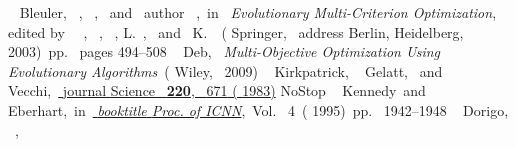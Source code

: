 \documentclass[preprint,linenumbers,amsmath,amssymb,aps,prstab]{revtex4-1}%
\begin{document}
\begin{thebibliography}{37}
\BibitemOpen
{} { {~\bibnamefont
		{Bleuler}},  {~},
	 {~}, \ and\ \bibinfo
	{author} {~},\ }in\ \href@noop {}
{\emph { {{E}volutionary {M}ulti-{C}riterion
			{O}ptimization}}},\  {edited by\ 
	{\ }, 
	{\ }, 
	{~},  {\bibfnamefont
		{L.}~}, \ and\  {\bibfnamefont
		{K.}~}}\ ( {Springer},\ \bibinfo
{address} {Berlin, Heidelberg},\  {2003})\ pp.\ \bibinfo
{pages} {494--508}%
%
\BibitemOpen
{} { {~\bibnamefont
		{Deb}},\ }\href@noop {} {\emph { {{M}ulti-{O}bjective
			{O}ptimization {U}sing {E}volutionary {A}lgorithms}}}\ (
{Wiley},\  {2009})%
%
\BibitemOpen
{} { {~\bibnamefont
		{Kirkpatrick}},  {\ \bibnamefont
		{Gelatt}}, \ and\  {\ \bibnamefont
		{Vecchi}},\ }\href {\doibase 10.1126/science.220.4598.671} {\bibfield
	{journal} { {Science}\ }\textbf {
		{220}},\  {671} ( {1983})}\BibitemShut
{NoStop}%
%
\BibitemOpen
{} { {~\bibnamefont
		{Kennedy}}\ and\  {~\bibnamefont
		{Eberhart}},\ }in\ \href {\doibase 10.1109/ICNN.1995.488968} {\emph {\bibinfo
		{booktitle} {Proc. of ICNN}}},\ Vol.~ {4}\ (
{1995})\ pp.\  {1942--1948}%
%
\BibitemOpen
{} { {~\bibnamefont
		{Dorigo}},  {~}, \
}
\end{thebibliography}
\end{document}
